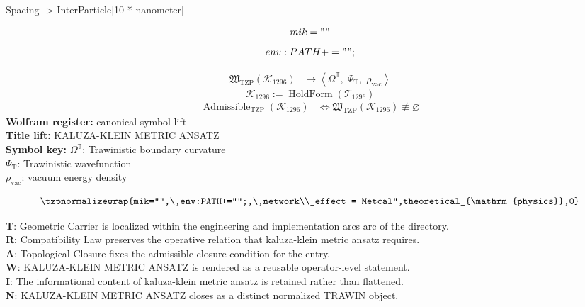 
\begin{tzpsnapshot}
\end{tzpsnapshot}

Spacing -> InterParticle[10 * nanometer]

\[
mik=""
\]
\[
env:PATH+="";
\]

\noindent
\begin{minipage}[t]{0.48\linewidth}
\begingroup
\small
\[
\begin{aligned}
\mathfrak{W}_{\mathrm{TZP}}\!\left(\mathcal{K}_{1296}\right)
&\longmapsto
\left\langle \Omega^{\mathbb{T}},\; \Psi_{\mathrm{T}},\; \rho_{\mathrm{vac}} \right\rangle
\end{aligned}
\]
\[
\mathcal{K}_{1296}
:=
\operatorname{HoldForm}\!\left(\mathcal{T}_{1296}\right)
\]
\[
\begin{aligned}
\operatorname{Admissible}_{\mathrm{TZP}}\!\left(\mathcal{K}_{1296}\right)
&\Longleftrightarrow
\mathfrak{W}_{\mathrm{TZP}}\!\left(\mathcal{K}_{1296}\right)\not\equiv\varnothing
\end{aligned}
\]
\textbf{Wolfram register:} canonical symbol lift\\
\textbf{Title lift:} KALUZA-KLEIN METRIC ANSATZ\\
\textbf{Symbol key:} \(\Omega^{\mathbb{T}}\): Trawinistic boundary curvature\\ \(\Psi_{\mathrm{T}}\): Trawinistic wavefunction\\ \(\rho_{\mathrm{vac}}\): vacuum energy density
\par
\endgroup
\end{minipage}\hfill
\begin{minipage}[t]{0.48\linewidth}
\[
\tzpnormalizewrap{mik="",\,env:PATH+="";,\,network\\_effect = Metcal",theoretical_{\mathrm{physics}},0}
\]

\small
\textbf{T}: Geometric Carrier is localized within the engineering and implementation arcs arc of the directory.\\
\textbf{R}: Compatibility Law preserves the operative relation that kaluza-klein metric ansatz requires.\\
\textbf{A}: Topological Closure fixes the admissible closure condition for the entry.\\
\textbf{W}: KALUZA-KLEIN METRIC ANSATZ is rendered as a reusable operator-level statement.\\
\textbf{I}: The informational content of kaluza-klein metric ansatz is retained rather than flattened.\\
\textbf{N}: KALUZA-KLEIN METRIC ANSATZ closes as a distinct normalized TRAWIN object.
\normalsize
\end{minipage}

